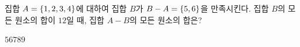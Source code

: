 집합 $A=\{1{,}\mkern3mu\mathopen{}2{,}\mkern3mu\mathopen{}3{,}\mkern3mu\mathopen{}4\}$에 대하여 집합 $B$가 $B-A=\{5{,}\mkern3mu\mathopen{}6\}$을 만족시킨다. 집합 $B$의 모든 원소의 합이 $12$일 때, 집합 $A-B$의 모든 원소의 합은?
\begin{choices32}{$5$}{$6$}{$7$}{$8$}{$9$}\end{choices32}
